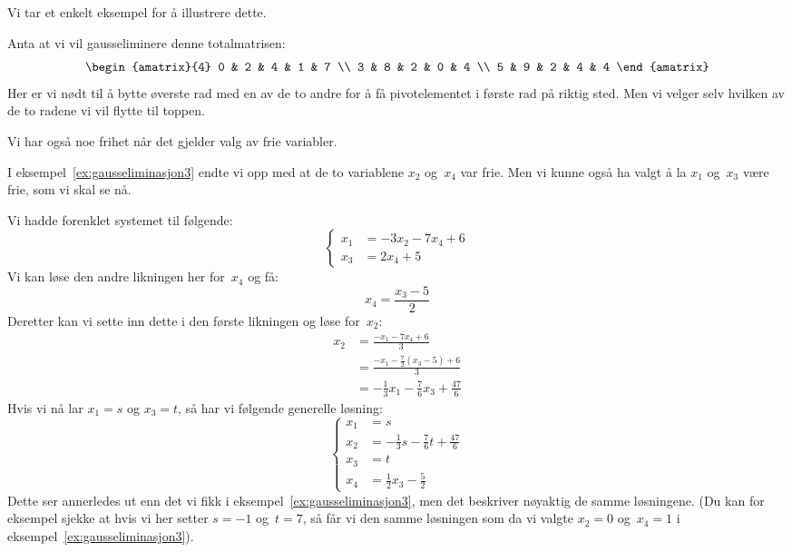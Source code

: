 Vi tar et enkelt eksempel for å illustrere dette.

\begin{ex}
Anta at vi vil gausseliminere denne totalmatrisen:
\[
\begin{amatrix}{4}
0 & 2 & 4 & 1 & 7 \\
3 & 8 & 2 & 0 & 4 \\
5 & 9 & 2 & 4 & 4
\end{amatrix}
\]
Her er vi nødt til å bytte øverste rad med en av de to andre for å få
pivotelementet i første rad på riktig sted.  Men vi velger selv
hvilken av de to radene vi vil flytte til toppen.
\end{ex}

Vi har også noe frihet når det gjelder valg av frie variabler.

\begin{ex}
I eksempel~\ref{ex:gausseliminasjon3} endte vi opp med at de to
variablene $x_2$ og~$x_4$ var frie.  Men vi kunne også ha valgt å la
$x_1$ og~$x_3$ være frie, som vi skal se nå.

Vi hadde forenklet systemet til følgende:
\[
\left\{
\begin{aligned}
x_1 &= - 3 x_2 - 7 x_4 + 6 \\
x_3 &= 2 x_4 + 5
\end{aligned}
\right.
\]
Vi kan løse den andre likningen her for~$x_4$ og få:
\[
x_4 = \frac{x_3 - 5}{2}
\]
Deretter kan vi sette inn dette i den første likningen og løse
for~$x_2$:
\begin{align*}
x_2
&= \frac{- x_1 - 7 x_4 + 6}{3} \\
&= \frac{- x_1 - \frac{7}{2} (x_3 - 5) + 6}{3} \\
&= - \frac{1}{3} x_1 - \frac{7}{6} x_3 + \frac{47}{6}
\end{align*}
Hvis vi nå lar $x_1 = s$ og $x_3 = t$, så har vi følgende generelle
løsning:
\[
\left\{
\begin{aligned}
x_1 &= s \\
x_2 &= - \frac{1}{3} s - \frac{7}{6} t + \frac{47}{6} \\
x_3 &= t \\
x_4 &= \frac{1}{2} x_3 - \frac{5}{2}
\end{aligned}
\right.
\]
Dette ser annerledes ut enn det vi fikk i
eksempel~\ref{ex:gausseliminasjon3}, men det beskriver nøyaktig de
samme løsningene.  (Du kan for eksempel sjekke at hvis vi her setter
$s=-1$ og~$t=7$, så får vi den samme løsningen som da vi valgte
$x_2=0$ og~$x_4=1$ i eksempel~\ref{ex:gausseliminasjon3}).
\end{ex}


\kapittelslutt
